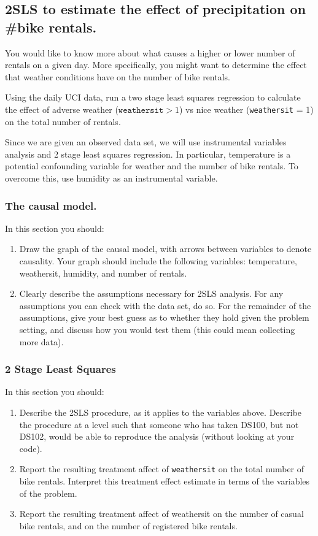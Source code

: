 \documentclass[12pt, answers, addpoints]{exam}
\begin{document}
 \subsection{2SLS to estimate the effect of precipitation on \#bike rentals.}
 
 
 You would like to know more about what causes a higher or lower number of rentals on a given day.  More specifically, you might want to determine the effect that weather conditions have on the number of bike rentals. 
 
 Using the daily UCI data, run a two stage least squares regression to calculate the effect of adverse weather ($\texttt{weathersit} > 1$) vs nice weather (\texttt{weathersit} = 1) on the total number of rentals. 
 
 Since we are given an observed data set, we will use instrumental variables analysis and 2 stage least squares regression. In particular, temperature is a potential confounding variable for weather and the number of bike rentals. To overcome this, use humidity as an instrumental variable. 
 
 \subsubsection{The causal model.}
 In this section you should:
 \begin{enumerate}
     \item Draw the graph of the causal model, with arrows between variables to denote causality. Your graph should include the following variables: temperature, weathersit, humidity, and number of rentals. 
     \item Clearly describe the assumptions necessary for 2SLS analysis. For any assumptions you can check with the data set, do so. For the remainder of the assumptions, give your best guess as to whether they hold given the problem setting, and discuss how you would test them (this could mean collecting more data). 
\end{enumerate}
     
\subsubsection{2 Stage Least Squares}
In this section you should:
\begin{enumerate}
    \item Describe the 2SLS procedure, as it applies to the variables above. Describe the procedure at a level such that someone who has taken DS100, but not DS102, would be able to reproduce the analysis (without looking at your code).
    \item Report the resulting treatment affect of \texttt{weathersit} on the total number of bike rentals. Interpret this treatment effect estimate in terms of the variables of the problem.
    \item Report the resulting treatment affect of weathersit on the number of casual bike rentals, and on the number of registered bike rentals. 
\end{enumerate}
\end{document}
